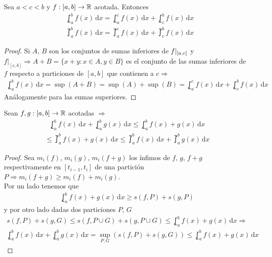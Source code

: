 \begin{theorem}
  Sea \(a < c < b\) y \(f: [a, b] \to \mathbb{R} \) acotada. Entonces \begin{align*}
     & \lowint_a^b f(x)\,\mathrm{d}x = \lowint_a^c f(x)\,\mathrm{d}x + \lowint_c^b f(x)\,\mathrm{d}x \\
     & \upint_a^b f(x)\, \mathrm{d}x = \upint_a^c f(x)\, \mathrm{d}x + \upint_c^b f(x)\, \mathrm{d}x
  \end{align*}

  \begin{proof}
    Si \(A\), \(B\) son los conjuntos de sumas inferiores de \(f|_{\interval[open right]{a}{c}} \) y \( f|_{[c, b]} \Rightarrow A + B = \{ x+y : x \in A, y \in B \} \) es el conjunto de las sumas inferiores de \(f\) respecto a particiones
    de \([a, b]\) que contienen a \(c \Rightarrow \) \begin{align*}
      \lowint_a^b f(x)\,\mathrm{d}x = \sup(A+B) = \sup(A) + \sup(B) = \lowint_a^c f(x)\,\mathrm{d}x + \lowint_c^b f(x)\,\mathrm{d}x
    \end{align*}
    Análogamente para las sumas superiores.
  \end{proof}
\end{theorem}

\begin{prop}
  Sean \(f, g: [a, b] \to \mathbb{R} \) acotadas \(\Rightarrow \)
  \begin{align*}
    \lowint_a^b f(x)\,\mathrm{d}x + \lowint_a^b g(x)\,\mathrm{d}x \leq \lowint_a^b f(x)+g(x)\,\mathrm{d}x
  \end{align*}
  \begin{align*}
    \leq \upint_a^b f(x) + g(x)\, \mathrm{d}x \leq \upint_a^b f(x)\, \mathrm{d}x + \upint_a^b g(x)\, \mathrm{d}x
  \end{align*}
  \begin{proof}
    Sea \(m_i(f)\), \(m_i(g)\), \(m_i(f+g)\) los ínfimos de \(f\), \(g\), \(f+g\) respectivamente en \([t_{i-1}, t_i]\) de una partición \(P \Rightarrow m_i(f+g) \geq m_i(f) + m_i(g)\). \\
    Por un lado tenemos que \begin{align*}
      \lowint_a^b f(x)+g(x)\, \mathrm{d}x \geq s(f, P) + s(g, P)
    \end{align*} y por otro lado dadas dos particiones \(P\), \(G\) \begin{align*}
      s(f, P) + s(g, G) \leq s(f, P \cup G) + s(g, P \cup G) \leq \lowint_a^b f(x)+g(x)\,\mathrm{d}x \Rightarrow
    \end{align*}
    \begin{align*}
      \lowint_a^b f(x) \, \mathrm{d}x + \lowint_a^b g(x) \, \mathrm{d}x = \sup_{P, G}(s(f, P)+s(g, G)) \leq \lowint_a^b f(x) + g(x)\, \mathrm{d}x
    \end{align*}
  \end{proof}
\end{prop}


